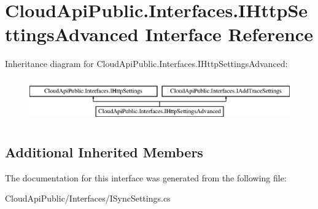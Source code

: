 \hypertarget{interface_cloud_api_public_1_1_interfaces_1_1_i_http_settings_advanced}{\section{Cloud\-Api\-Public.\-Interfaces.\-I\-Http\-Settings\-Advanced Interface Reference}
\label{interface_cloud_api_public_1_1_interfaces_1_1_i_http_settings_advanced}
}
Inheritance diagram for Cloud\-Api\-Public.\-Interfaces.\-I\-Http\-Settings\-Advanced\-:\begin{figure}[H]
\begin{center}
\leavevmode
\includegraphics[height=1.879195cm]{interface_cloud_api_public_1_1_interfaces_1_1_i_http_settings_advanced}
\end{center}
\end{figure}
\subsection*{Additional Inherited Members}


The documentation for this interface was generated from the following file\-:\begin{DoxyCompactItemize}
\item 
Cloud\-Api\-Public/\-Interfaces/I\-Sync\-Settings.\-cs\end{DoxyCompactItemize}
